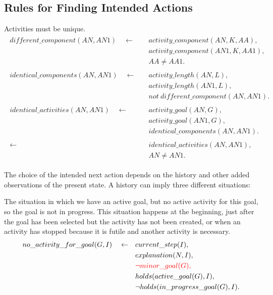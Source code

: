 \documentclass[11pt, oneside]{article}
\begin{document}
\subsection{Rules for Finding Intended Actions}
Activities must be unique.
\begin{align}\begin{split}
different\_component(AN,AN1)\quad \leftarrow \quad &activity\_component(AN,K,AA),\\
&activity\_component(AN1, K, AA1),\\
&AA \neq AA1.\\
\\
identical\_components(AN,AN1)\quad \leftarrow \quad &activity\_length(AN,L),\\ 
&activity\_length(AN1,L),\\
&not\ different\_component(AN,AN1).\\
\\
identical\_activities(AN,AN1)\quad \leftarrow \quad &activity\_goal(AN,G), \\ 
&activity\_goal(AN1,G),\\
&identical\_components(AN,AN1).\\
\\
\leftarrow \quad &identical\_activities(AN,AN1),\\
&AN\neq AN1.
\end{split}\end{align}


The choice of the intended next action depends on the history and other added observations of the present state. 
A history can imply three different situations:


The situation in which we have an active goal, but no active activity for this goal, so the goal is not in progress. This situation happens at the beginning, just after the goal has been selected but the activity has not been created, or when an activity has  stopped because it is futile and another activity is necessary.
\begin{align}\begin{split}
no\_activity\_for\_goal(G,I)\quad \leftarrow \quad &current\_step(I),\\
&explanation(N,I),\\
&\textcolor{red}{\neg minor\_goal(G),}\\
&holds(active\_goal(G),I),\\
&\neg holds(in\_progress\_goal(G),I).
\end{split}\end{align}
\end{document}
